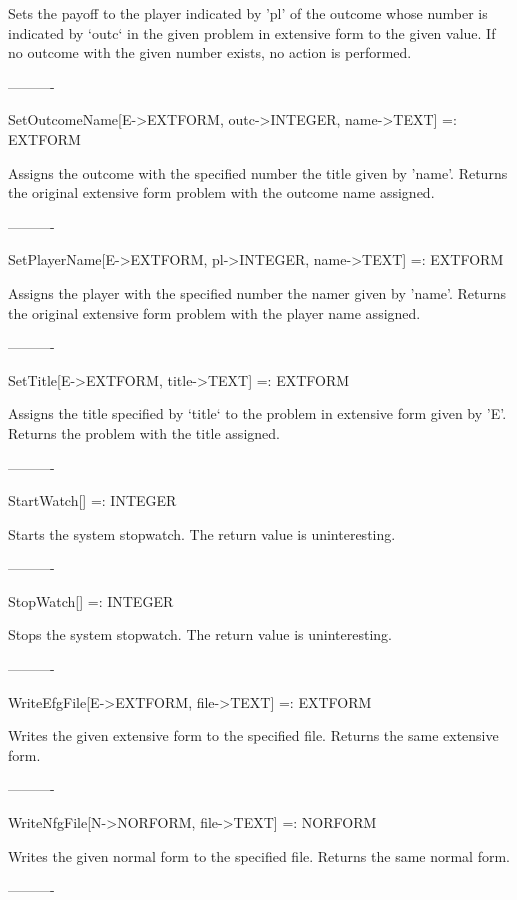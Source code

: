 	Sets the payoff to the player indicated by 'pl' of the outcome whose 
number is indicated by `outc` in the given problem in extensive form to the
given value.  If no outcome with the given number exists, no action is 
performed. 

----------

SetOutcomeName[E->EXTFORM, outc->INTEGER, name->TEXT] =: EXTFORM

	Assigns the outcome with the specified number the title given by 
'name'.  Returns the original extensive form problem with the outcome name 
assigned.

----------

SetPlayerName[E->EXTFORM, pl->INTEGER, name->TEXT] =: EXTFORM

	Assigns the player with the specified number the namer given by 'name'.
Returns the original extensive form problem with the player name assigned.

----------

SetTitle[E->EXTFORM, title->TEXT] =: EXTFORM

	Assigns the title specified by `title` to the problem in extensive form
given by 'E'.  Returns the problem with the title assigned.

----------

StartWatch[] =: INTEGER

	Starts the system stopwatch.  The return value is uninteresting.

----------

StopWatch[] =: INTEGER

	Stops the system stopwatch.  The return value is uninteresting.

----------

WriteEfgFile[E->EXTFORM, file->TEXT] =: EXTFORM

	Writes the given extensive form to the specified file.  Returns the
same extensive form.

----------

WriteNfgFile[N->NORFORM, file->TEXT] =: NORFORM

	Writes the given normal form to the specified file.  Returns the
same normal form.

----------






























